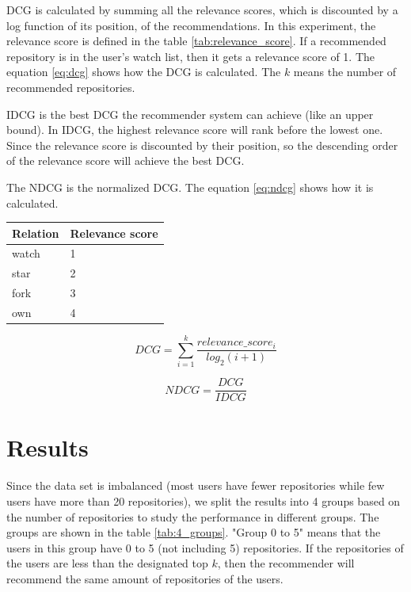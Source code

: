 \documentclass[11pt,twoside]{report}
\begin{document}
DCG is calculated by summing all the relevance scores, which is discounted by a log function of its position, of the recommendations. In this experiment, the relevance score is defined in the table \ref{tab:relevance_score}. If a recommended repository is in the user's watch list, then it gets a relevance score of 1. The equation \ref{eq:dcg} shows how the DCG is calculated. The $k$ means the number of recommended repositories.

IDCG is the best DCG the recommender system can achieve (like an upper bound). In IDCG, the highest relevance score will rank before the lowest one. Since the relevance score is discounted by their position, so the descending order of the relevance score will achieve the best DCG.

The NDCG is the normalized DCG. The equation \ref{eq:ndcg} shows how it is calculated.

\begin{center}
    \begin{tabular}{l | l}
    \hline
    Relation & Relevance score \\
    \hline
    watch & 1 \\
    star & 2 \\
    fork & 3 \\
    own & 4
    \end{tabular}
    \label{tab:relevance_score}
\end{center}

\begin{equation}
    DCG=\sum_{i=1}^k\frac{relevance\_score_i}{log_2(i+1)}
    \label{eq:dcg}
\end{equation}

\begin{equation}
    NDCG=\frac{DCG}{IDCG}
    \label{eq:ndcg}
\end{equation}

\section{Results}
Since the data set is imbalanced (most users have fewer repositories while few users have more than 20 repositories), we split the results into 4 groups based on the number of repositories to study the performance in different groups. The groups are shown in the table \ref{tab:4_groups}. "Group 0 to 5" means that the users in this group have 0 to 5 (not including 5) repositories. If the repositories of the users are less than the designated top $k$, then the recommender will recommend the same amount of repositories of the users.
\end{document}
